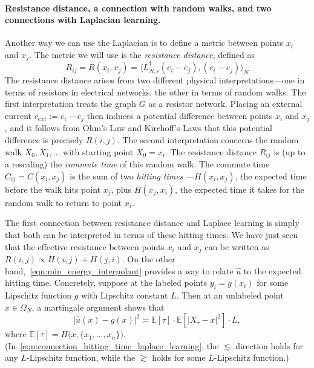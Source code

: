 \documentclass{article}
\newcommand{\1}{\mathbf{1}}
\newcommand{\Ebb}{\mathbb{E}}
\newcommand{\wh}[1]{\widehat{#1}}
\theoremstyle{definition}
\theoremstyle{remark}
\begin{document}
\paragraph{Resistance distance, a connection with random walks, and two connections with Laplacian learning.}
Another way we can use the Laplacian is to define a metric between points $x_i$ and $x_j$. The metric we will use is the \emph{resistance distance}, defined as 
\begin{equation*}
R_{ij} = R(x_i,x_j) = \bigl \langle L_{N,\varepsilon}^{\dagger}(e_i - e_j),(e_i - e_j)\bigr \rangle_N
\end{equation*}
The resistance distance arises from two different physical interpretations---one in terms of resistors in electrical networks, the other in terms of random walks. The first interpretation treats the graph $G$ as a resistor network. Placing an external current $c_{ext} := e_i - e_j$ then induces a potential difference between points $x_i$ and $x_j$, and it follows from Ohm's Law and Kirchoff's Laws that this potential difference is precisely $R(i,j)$. The second interpretation concerns the random walk $X_0,X_1,\ldots$ with starting point $X_0 = x_i$. The resistance distance $R_{ij}$ is (up to a rescaling) the \emph{commute time} of this random walk. The commute time $C_{ij} = C(x_i,x_j)$ is the sum  of two \emph{hitting times}
---$H(x_i,x_j)$, the expected time before the walk hits point $x_j$, plus $H(x_j,x_i)$, the expected time it takes for the random walk to return to point $x_i$. 

The first connection between resistance distance and Laplace learning is simply that both can be interpreted in terms of these hitting times. We have just seen that the effective resistance between points $x_i$ and $x_j$ can be written as $R(i,j) \propto H(i,j) + H(j,i)$. On the other hand,~\eqref{eqn:min_energy_interpolant} provides a way to relate $\wh{u}$ to the expected hitting time. Concretely, suppose at the labeled points $y_i = g(x_i)$ for some Lipschitz function $g$ with Lipschitz constant $L$. Then at an unlabeled point $x \in \Omega_N$, a martingale argument shows that
\begin{equation}
\label{eqn:connection_hitting_time_laplace_learning}
\bigl|\wh{u}(x) - g(x)\bigr|^2 \asymp \Ebb[\tau] \cdot \Ebb[|X_{\tau} - x|^2]  \cdot L,
\end{equation}
where $\Ebb[\tau] = H\bigl(x,\{x_1,\ldots,x_n\}\bigr)$. (In~\eqref{eqn:connection_hitting_time_laplace_learning}, the $\lesssim$ direction holds for any $L$-Lipschitz function, while the $\gtrsim$ holds for some $L$-Lipschitz function.)
\end{document}
